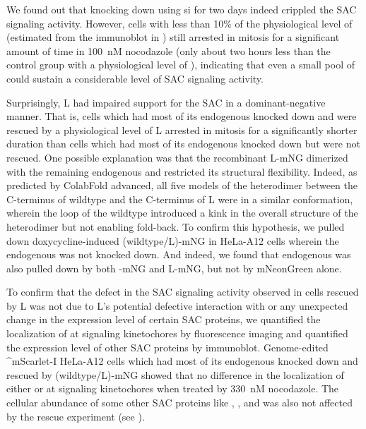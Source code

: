 We found out that knocking down  using si for two days indeed crippled the SAC signaling activity. However, cells with less than 10\% of the physiological level of  (estimated from the immunoblot in ) still arrested in mitosis for a significant amount of time in \SI{100}{nM} nocodazole (only about two hours less than the control group with a physiological level of ), indicating that even a small pool of  could sustain a considerable level of SAC signaling activity.


Surprisingly, \textDelta{}L had impaired support for the SAC in a dominant-negative manner. That is, cells which had most of its endogenous  knocked down and were rescued by a physiological level of \textDelta{}L arrested in mitosis for a significantly shorter duration than cells which had most of its endogenous  knocked down but were not rescued. One possible explanation was that the recombinant \textDelta{}L-mNG dimerized with the remaining endogenous  and restricted its structural flexibility. Indeed, as predicted by ColabFold advanced, all five models of the heterodimer between the C-terminus of wildtype  and the C-terminus of \textDelta{}L were in a similar conformation, wherein the loop of the wildtype  introduced a kink in the overall structure of the heterodimer but not enabling fold-back. To confirm this hypothesis, we pulled down doxycycline-induced (wildtype/\textDelta{}L)-mNG in HeLa-A12 cells wherein the endogenous  was not knocked down. And indeed, we found that endogenous  was also pulled down by both -mNG and \textDelta{}L-mNG, but not by mNeonGreen alone.

To confirm that the defect in the SAC signaling activity observed in cells rescued by \textDelta{}L was not due to \textDelta{}L's potential defective interaction with  or any unexpected change in the expression level of certain SAC proteins, we quantified the localization of  at signaling kinetochores by fluorescence imaging and quantified the expression level of other SAC proteins by immunoblot. Genome-edited ^mScarlet-I HeLa-A12 cells which had most of its endogenous  knocked down and rescued by (wildtype/\textDelta{}L)-mNG showed that no difference in the localization of either  or  at signaling kinetochores when treated by \SI{330}{nM} nocodazole. The cellular abundance of some other SAC proteins like , , and  was also not affected by the rescue experiment (see ).

